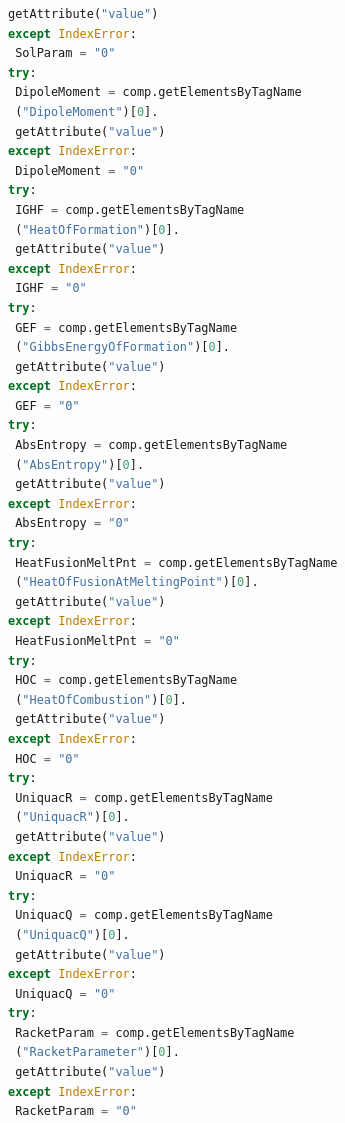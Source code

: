 \documentclass[12pt]{report}
\begin{document}
\begin{lstlisting}[language=Python]
 getAttribute("value")
except IndexError:
 SolParam = "0"
try:  
 DipoleMoment = comp.getElementsByTagName
 ("DipoleMoment")[0].
 getAttribute("value")  
except IndexError:
 DipoleMoment = "0"
try:   
 IGHF = comp.getElementsByTagName
 ("HeatOfFormation")[0].
 getAttribute("value")
except IndexError:
 IGHF = "0"
try:  
 GEF = comp.getElementsByTagName
 ("GibbsEnergyOfFormation")[0].
 getAttribute("value")
except IndexError:
 GEF = "0"
try:   
 AbsEntropy = comp.getElementsByTagName
 ("AbsEntropy")[0].
 getAttribute("value")
except IndexError:
 AbsEntropy = "0"
try:  
 HeatFusionMeltPnt = comp.getElementsByTagName
 ("HeatOfFusionAtMeltingPoint")[0].
 getAttribute("value")
except IndexError:
 HeatFusionMeltPnt = "0"  
try:   
 HOC = comp.getElementsByTagName
 ("HeatOfCombustion")[0].
 getAttribute("value")
except IndexError: 
 HOC = "0"
try:
 UniquacR = comp.getElementsByTagName
 ("UniquacR")[0].
 getAttribute("value")
except IndexError:
 UniquacR = "0"
try:
 UniquacQ = comp.getElementsByTagName
 ("UniquacQ")[0].
 getAttribute("value")
except IndexError:
 UniquacQ = "0"
try:
 RacketParam = comp.getElementsByTagName
 ("RacketParameter")[0].
 getAttribute("value")
except IndexError:
 RacketParam = "0"



\end{lstlisting}
\end{document}
